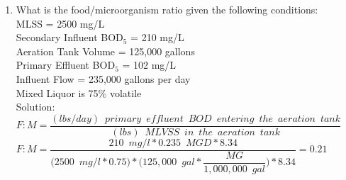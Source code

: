 \documentclass{article}
\begin{document}
\begin{enumerate}

\item What is the food/microorganism ratio given the following conditions:\\
MLSS = 2500 mg/L\\
Secondary Influent BOD$_5$ = 210 mg/L\\
Aeration Tank Volume = 125,000 gallons\\
Primary Effluent BOD$_5$ = 102 mg/L\\
Influent Flow = 235,000 gallons per day\\
Mixed Liquor is 75\% volatile\\

Solution:\\
\vspace{0.3cm}
$F:M=\dfrac{(lbs/day) \enspace primary \enspace effluent  \enspace BOD \enspace entering \enspace the  \enspace aeration \enspace tank}{(lbs) \enspace MLVSS \enspace in \enspace the  \enspace aeration \enspace tank}$\\
\vspace{0.3cm}
$F:M=\dfrac{210 \enspace mg/l*0.235 \enspace MGD*8.34}{\big(2500 \enspace mg/l*0.75\big)*\bigg(125,000 \enspace gal*\dfrac{MG}{1,000,000 \enspace gal}\bigg)*8.34}=\boxed{0.21}$\\


\end{enumerate}
\end{document}
